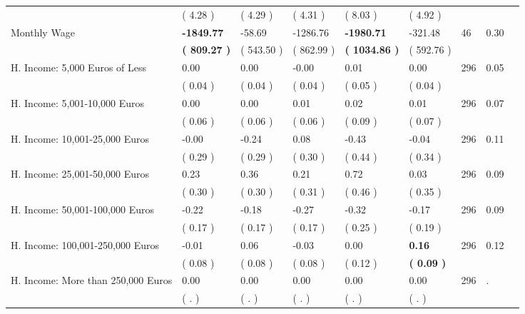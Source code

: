 \begin{tabular}{L{6.2cm} C{1.8cm} C{1.8cm} C{1.8cm} C{1.8cm} C{1.8cm} C{1.8cm} C{0.3cm} C{0.3cm}}
 & (     4.28 ) & (     4.29 ) & (     4.31 ) & (     8.03 ) & (     4.92 )  & \\
Monthly Wage & \textbf{ -1849.77} &    -58.69 &  -1286.76 & \textbf{ -1980.71} &   -321.48  & 46 &       0.30 \\ 
 & \textbf{(   809.27 )} & (   543.50 ) & (   862.99 ) & \textbf{(  1034.86 )} & (   592.76 )  & \\
H. Income: 5,000 Euros of Less &      0.00 &      0.00 &     -0.00 &      0.01 &      0.00  & 296 &       0.05 \\ 
 & (     0.04 ) & (     0.04 ) & (     0.04 ) & (     0.05 ) & (     0.04 )  & \\
H. Income: 5,001-10,000 Euros &      0.00 &      0.00 &      0.01 &      0.02 &      0.01  & 296 &       0.07 \\ 
 & (     0.06 ) & (     0.06 ) & (     0.06 ) & (     0.09 ) & (     0.07 )  & \\
H. Income: 10,001-25,000 Euros &     -0.00 &     -0.24 &      0.08 &     -0.43 &     -0.04  & 296 &       0.11 \\ 
 & (     0.29 ) & (     0.29 ) & (     0.30 ) & (     0.44 ) & (     0.34 )  & \\
H. Income: 25,001-50,000 Euros &      0.23 &      0.36 &      0.21 &      0.72 &      0.03  & 296 &       0.09 \\ 
 & (     0.30 ) & (     0.30 ) & (     0.31 ) & (     0.46 ) & (     0.35 )  & \\
H. Income: 50,001-100,000 Euros &     -0.22 &     -0.18 &     -0.27 &     -0.32 &     -0.17  & 296 &       0.09 \\ 
 & (     0.17 ) & (     0.17 ) & (     0.17 ) & (     0.25 ) & (     0.19 )  & \\
H. Income: 100,001-250,000 Euros &     -0.01 &      0.06 &     -0.03 &      0.00 & \textbf{     0.16}  & 296 &       0.12 \\ 
 & (     0.08 ) & (     0.08 ) & (     0.08 ) & (     0.12 ) & \textbf{(     0.09 )}  & \\
H. Income: More than 250,000 Euros &      0.00 &      0.00 &      0.00 &      0.00 &      0.00  & 296 &          . \\ 
 & (        . ) & (        . ) & (        . ) & (        . ) & (        . )  & \\
\bottomrule
\end{tabular}
